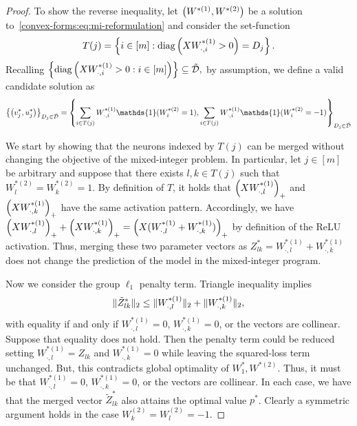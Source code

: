 \begin{proof}
    To show the reverse inequality, let \( \left(W^{*(1)}, W^{*(2)}\right) \) be a
    solution to~\eqref{convex-forms:eq:mi-reformulation} and consider the
    set-function
    \[
        T(j) = \left\{ i \in [m] : \text{diag}\left(X W^{*(1)}_{\cdot, i} > 0\right) = D_j \right\}.
    \]
    Recalling
    \( \left\{\text{diag}\left(X W^{*(1)}_{\cdot, i} > 0 : i \in [m]\right) \right\} \subseteq \tilde {\mathcal{D}}, \)
    by assumption, we define a valid candidate solution as
    \begin{equation*}
        \cbr{\rbr{v_j^*, u_j^*}}_{D_j \in \tilde \calD} = \cbr{ \sum_{i \in T(j)} W^{*(1)}_{\cdot, i} \mathds{1}(W^{*(2)}_{i} = 1), \sum_{i \in T(j)} W^{*(1)}_{\cdot, i} \mathds{1}(W^{*(2)}_{i} = -1) }_{D_j \in \tilde \calD}
    \end{equation*}

    We start by showing that the neurons indexed by \( T(j) \) can be merged without changing the objective of the mixed-integer problem.
    In particular, let \( j \in [m] \) be arbitrary and suppose that there
    exists \( l,k \in T(j) \) such that \( W^{*(2)}_{l} = W^{*(2)}_{k} = 1 \).
    By definition of \( T \), it holds that
    \( \left(X W^{*(1)}_{\cdot, l}\right)_+ \) and \( \left(X W^{*(1)}_{\cdot, k}\right)_+ \) have the same activation pattern.
    Accordingly, we have \(  \left(X W^{*(1)}_{\cdot, l}\right)_+ + \left(X W^{*(1)}_{\cdot, k}\right)_+ = \left(X (W^{*(1)}_{\cdot, l} + W^{*(1)}_{\cdot, k})\right)_+ \) by definition of the ReLU activation.
    Thus, merging these two parameter vectors as \( Z_{lk}^* = W^{*(1)}_{\cdot, l} + W^{*(1)}_{\cdot, k}\) does not change the prediction of the model in the mixed-integer program.

    Now we consider the group \( \ell_1 \) penalty term.
    Triangle inequality implies
    \begin{align*}
        \|\tilde Z_{lk}^*\|_2 \leq \|W^{*(1)}_{\cdot, l}\|_2 + \|W^{*(1)}_{\cdot, k}\|_2,
    \end{align*}
    with equality if and only if \( W^{*(1)}_{\cdot, l} = 0 \), \( W^{*(1)}_{\cdot, k} = 0 \), or the vectors are collinear.
    Suppose that equality does not hold.
    Then the penalty term could be reduced setting \( W^{*(1)}_{\cdot, l} = Z_{lk} \) and \( W^{*(1)}_{\cdot, k} = 0\) while leaving the squared-loss term unchanged.
    But, this contradicts global optimality of \(W_{1}^*, W^{*(2)} \).
    Thus, it must be that \( W^{*(1)}_{\cdot, l} = 0 \), \( W^{*(1)}_{\cdot, k} = 0 \), or the vectors are collinear.
    In each case, we have that the merged vector \( \tilde Z_{lk}^* \) also attains the optimal value \( p^* \).
    Clearly a symmetric argument holds in the case \( W^{(2)}_{k} = W^{(2)}_{l} = -1 \).


\end{proof}
